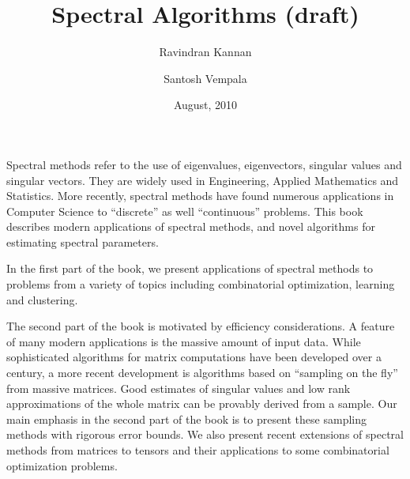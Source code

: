 \documentclass{book}
\numberwithin{exercise}{chapter}
\begin{document}
\frontmatter
\title{\LARGE\bf Spectral Algorithms (draft)}

\author{
Ravindran Kannan
\and
Santosh Vempala
}

\date{August, 2010}

\maketitle

Spectral methods refer to the use of eigenvalues, eigenvectors, singular values and singular vectors.
They are widely used in Engineering, Applied Mathematics and Statistics. More recently,
spectral methods have found numerous applications in Computer Science to ``discrete'' as well
``continuous'' problems.
This book describes modern applications of spectral methods,
and novel algorithms for estimating spectral parameters.

In the first part of the book, we present applications of spectral
methods to problems from a variety of topics including combinatorial optimization,
learning and clustering.

The second part of the book is motivated by efficiency considerations.
A feature of many modern applications is the massive amount of input data. While sophisticated algorithms for matrix computations have been developed over
a century, a more recent development
is algorithms based on ``sampling on the fly'' from massive matrices. Good estimates of singular values and low rank approximations of the whole matrix can be provably derived from
a sample. Our main emphasis in the second part of the book is to present these sampling methods
with rigorous error bounds. We also present recent extensions of spectral
methods from matrices to tensors and their applications to some combinatorial optimization
problems.


\tableofcontents

\end{document}
